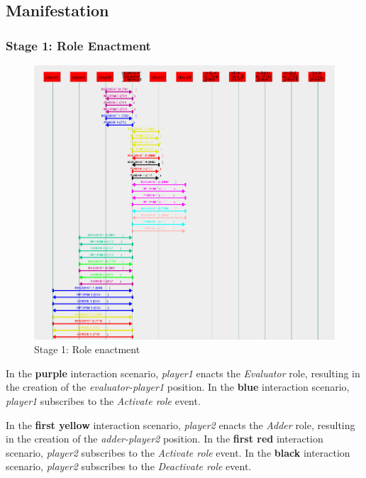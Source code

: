 \subsection*{Manifestation}

\subsubsection*{Stage 1: Role Enactment}

\begin{figure}[H]
	\centering
	\includegraphics[width=\textwidth]{images/examples/example2-stage1.png}
	\caption{Stage 1: Role enactment}
	\label{figure:example2-stage1}
\end{figure}

In the \textbf{purple} interaction scenario, \textit{player1} enacts the \textit{Evaluator} role, resulting in the creation of the \textit{evaluator-player1} position.
In the \textbf{blue} interaction scenario, \textit{player1} subscribes to the \textit{Activate role} event.

In the \textbf{first yellow} interaction scenario, \textit{player2} enacts the \textit{Adder} role, resulting in the creation of the \textit{adder-player2} position.
In the \textbf{first red} interaction scenario, \textit{player2} subscribes to the \textit{Activate role} event.
In the \textbf{black} interaction scenario, \textit{player2} subscribes to the \textit{Deactivate role} event.

